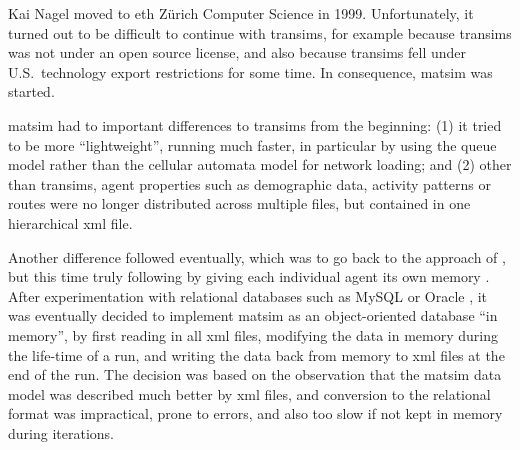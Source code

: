 Kai Nagel moved to \gls{eth} Zürich Computer Science in 1999.  Unfortunately, it turned out to be difficult to continue with \gls{transims}, for example because \gls{transims} was not under an open source license, and also because \gls{transims} fell under U.S.\ technology export restrictions for some time.  In consequence, \gls{matsim} was started.

\gls{matsim} had to important differences to \gls{transims} from the beginning: (1) it tried to be more ``lightweight'', \ie running much faster, in particular by using the queue model \citep{GawronPhd,Gawron1998IterativeAlgorithmto} rather than the cellular automata model for network loading; and (2) other than \gls{transims}, agent properties such as demographic data, activity patterns or routes were no longer distributed across multiple files, but contained in one hierarchical \gls{xml} file.

Another difference followed eventually, which was to go back to the approach of \citet{Nagel1996NRW}, but this time truly following \citet{ArthurBar} by giving each individual agent its own memory \citep{RaneyNagel2006traf-framework}.  After experimentation with relational databases such as MySQL \citep{mysql-wikipedia} or Oracle \citep{oracle}, it was eventually decided to implement \gls{matsim} as an object-oriented database ``in memory'', \ie by first reading in all \gls{xml} files, modifying the data in memory during the life-time of a run, and writing the data back from memory to \gls{xml} files at the end of the run.  The decision was based on the observation that the \gls{matsim} data model was described much better by \gls{xml} files, and conversion to the relational format was impractical, prone to errors, and also too slow if not kept in memory during iterations. 

